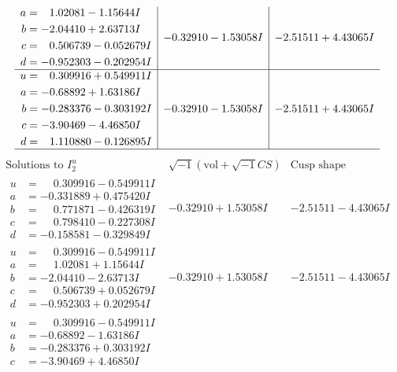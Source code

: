 \documentclass[1p]{elsarticle_modified}
\theoremstyle{definition}
\newcommand{\I}{\sqrt{-1}}
\begin{document}
$$\begin{array}{c|c|c}
\begin{aligned}
a &= \phantom{-}1.02081 - 1.15644 I \\
b &= -2.04410 + 2.63713 I \\
c &= \phantom{-}0.506739 - 0.052679 I \\
d &= -0.952303 - 0.202954 I\end{aligned}
 & -0.32910 - 1.53058 I & -2.51511 + 4.43065 I \\ \hline\begin{aligned}
u &= \phantom{-}0.309916 + 0.549911 I \\
a &= -0.68892 + 1.63186 I \\
b &= -0.283376 - 0.303192 I \\
c &= -3.90469 - 4.46850 I \\
d &= \phantom{-}1.110880 - 0.126895 I\end{aligned}
 & -0.32910 - 1.53058 I & -2.51511 + 4.43065 I\\
 \hline 
 \end{array}$$\newpage$$\begin{array}{c|c|c}  
\text{Solutions to }I^u_{2}& \I (\text{vol} + \sqrt{-1}CS) & \text{Cusp shape}\\
 \hline 
\begin{aligned}
u &= \phantom{-}0.309916 - 0.549911 I \\
a &= -0.331889 + 0.475420 I \\
b &= \phantom{-}0.771871 - 0.426319 I \\
c &= \phantom{-}0.798410 - 0.227308 I \\
d &= -0.158581 - 0.329849 I\end{aligned}
 & -0.32910 + 1.53058 I & -2.51511 - 4.43065 I \\ \hline\begin{aligned}
u &= \phantom{-}0.309916 - 0.549911 I \\
a &= \phantom{-}1.02081 + 1.15644 I \\
b &= -2.04410 - 2.63713 I \\
c &= \phantom{-}0.506739 + 0.052679 I \\
d &= -0.952303 + 0.202954 I\end{aligned}
 & -0.32910 + 1.53058 I & -2.51511 - 4.43065 I \\ \hline\begin{aligned}
u &= \phantom{-}0.309916 - 0.549911 I \\
a &= -0.68892 - 1.63186 I \\
b &= -0.283376 + 0.303192 I \\
c &= -3.90469 + 4.46850 I \\

\end{aligned}
\end{array}$$
\end{document}
